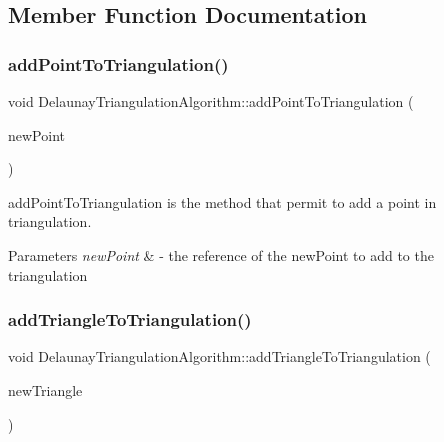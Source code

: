 \subsection{Member Function Documentation}
\mbox{\label{classDelaunayTriangulationAlgorithm_ab1844da431a8e6bdc1cd98153d0502db}} 
\subsubsection{\texorpdfstring{add\+Point\+To\+Triangulation()}{addPointToTriangulation()}}
{\footnotesize\ttfamily void Delaunay\+Triangulation\+Algorithm\+::add\+Point\+To\+Triangulation (\begin{DoxyParamCaption}\item[{const cg3\+::\+Point2\+Dd \&}]{new\+Point }\end{DoxyParamCaption})}



add\+Point\+To\+Triangulation is the method that permit to add a point in triangulation. 


\begin{DoxyParams}{Parameters}
{\em new\+Point} & -\/ the reference of the new\+Point to add to the triangulation \\
\hline
\end{DoxyParams}
\mbox{\label{classDelaunayTriangulationAlgorithm_a8782ae176a5b1b7045192ae079623ade}} 
\subsubsection{\texorpdfstring{add\+Triangle\+To\+Triangulation()}{addTriangleToTriangulation()}}
{\footnotesize\ttfamily void Delaunay\+Triangulation\+Algorithm\+::add\+Triangle\+To\+Triangulation (\begin{DoxyParamCaption}\item[{const \hyperlink{classTriangle}{Triangle} \&}]{new\+Triangle }\end{DoxyParamCaption})\hspace{0.3cm}{\ttfamily [inline]}}



